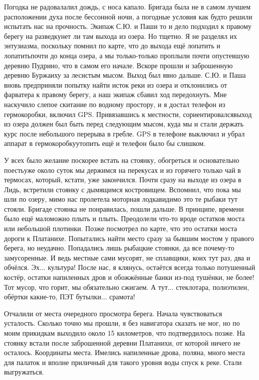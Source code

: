 Погодка не радовала\mdash лил дождь, с носа капало. Бригада была не в самом лучшем расположении духа после бессонной ночи, а погодные условия как будто решили испытать нас на прочность. Экипаж С.Ю. и Паши то и дело подходил к правому берегу на разведку\mdash нет ли там выхода из озера. Но тщетно. Я не разделял их энтузиазма, поскольку помнил по карте, что до выхода ещё лопатить и лопатить\mdash почти до конца озера, а мы только-только проплыли почти опустевшую деревню Пудрино, что в самом его начале. Вскоре прошли и заброшенную деревню Буржаиху за лесистым мысом. Выход был явно дальше. С.Ю. и Паша вновь предприняли попытку найти исток реки из озера и отклонились от фарватера к правому берегу, а наш экипаж сбавил ход передохнуть. Мне наскучило слепое скитание по водному простору, и я достал телефон из гермокоробки, включил GPS. Привязавшись к местности, сориентировался\mdash выход из озера должен был быть перед следующим мысом, куда мы и стали держать курс после небольшого перерыва в гребле. GPS в телефоне выключил и убрал аппарат в гермокоробку\mdash утопить ещё и телефон было бы слишком.

У всех было желание поскорее встать на стоянку, обогреться и основательно поесть\mdash уже около суток мы держимся на перекусах и из горячего только чай в термосах, который, кстати, уже закончился. Почти сразу на выходе из озера в Лидь, встретили стоянку с дымящимся костровищем. Вспомнил, что пока мы шли по озеру, мимо нас пролетела моторная лодка\mdash видимо это те рыбаки тут стояли. Бригаде стоянка не понравилась, пошли дальше. В принципе, времени было ещё мало\mdash можно плыть и плыть. Преодолели что-то вроде остатков моста или небольшой плотинки. Позже посмотрел по карте, что это остатки моста дороги к Платанихе. Попытались найти место сразу за бывшим мостом у правого берега, но неудачно. Попадались лишь рыбацкие стоянки, да все почему-то замусоренные. И ведь местные сами мусорят, не сплавщики, коих тут раз, два и обчёлся. Эх$\ldots$ культура! После нас, я клянусь, остаётся всегда только потушенный костёр, остатки напиленных дров и обожжённые банки из-под тушёнки, не более! Тот мусор, что горит, мы обязательно сжигаем. А тут$\ldots$ стеклотара, полиэтилен, обёртки какие-то, ПЭТ бутылки$\ldots$ срамота! 

Отчалили от места очередного просмотра берега. Начала чувствоваться усталость. Сколько точно мы прошли, я без навигатора сказать не мог, но по моим прикидкам выходило около 15 километров, что подтвердилось позже. На стоянку встали после заброшенной деревни Платанихи, от которой ничего не осталось. Координаты места\mdash \CoordsLidSeventeenFirst. Имелись напиленные дрова, поляна, много места для палаток и вполне приличный для такого уровня воды спуск к реке. Стали выгружаться. 

